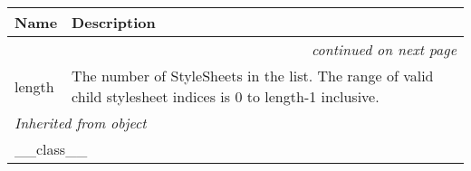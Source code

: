     \vspace{-1cm}
\hspace{\varindent}\begin{longtable}{|p{\varnamewidth}|p{\vardescrwidth}|l}
\cline{1-2}
\cline{1-2} \centering \textbf{Name} & \centering \textbf{Description}& \\
\cline{1-2}
\endhead\cline{1-2}\multicolumn{3}{r}{\small\textit{continued on next page}}\\\endfoot\cline{1-2}
\endlastfoot\raggedright l\-e\-n\-g\-t\-h\- & \raggedright The number of StyleSheets in the list. The range of valid
child stylesheet indices is 0 to length-1 inclusive.&\\
\cline{1-2}
\multicolumn{2}{|l|}{\textit{Inherited from object}}\\
\multicolumn{2}{|p{\varwidth}|}{\raggedright \_\_class\_\_}\\
\cline{1-2}
\end{longtable}

